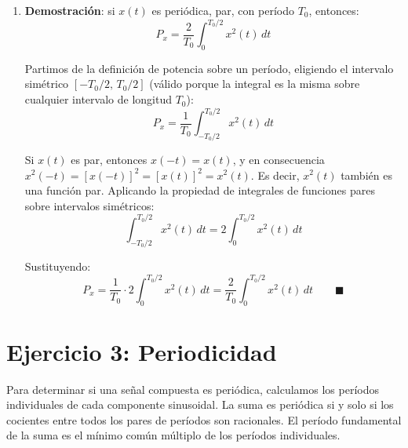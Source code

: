 \documentclass[10pt,a4paper]{article}
\begin{document}
\begin{enumerate}[label=\textbf{\alph*)}]
		\item \textbf{Demostración}: si $x(t)$ es periódica, par, con período $T_0$, entonces:
		\[
		P_x = \frac{2}{T_0}\int_{0}^{T_0/2} x^2(t)\,dt
		\]
		
		Partimos de la definición de potencia sobre un período, eligiendo el intervalo simétrico $[-T_0/2,\, T_0/2]$ (válido porque la integral es la misma sobre cualquier intervalo de longitud $T_0$):
		\[
		P_x = \frac{1}{T_0}\int_{-T_0/2}^{T_0/2} x^2(t)\,dt
		\]
		
		Si $x(t)$ es par, entonces $x(-t)=x(t)$, y en consecuencia $x^2(-t) = [x(-t)]^2 = [x(t)]^2 = x^2(t)$. Es decir, $x^2(t)$ también es una función par. Aplicando la propiedad de integrales de funciones pares sobre intervalos simétricos:
		\[
		\int_{-T_0/2}^{T_0/2} x^2(t)\,dt = 2\int_{0}^{T_0/2} x^2(t)\,dt
		\]
		
		Sustituyendo:
		\[
		P_x = \frac{1}{T_0}\cdot 2\int_{0}^{T_0/2} x^2(t)\,dt = \frac{2}{T_0}\int_{0}^{T_0/2} x^2(t)\,dt \qquad \blacksquare
		\]
	\end{enumerate}

	\section*{Ejercicio 3: Periodicidad}
	
	Para determinar si una señal compuesta es periódica, calculamos los períodos individuales de cada componente sinusoidal. La suma es periódica si y solo si los cocientes entre todos los pares de períodos son racionales. El período fundamental de la suma es el mínimo común múltiplo de los períodos individuales.
	
\end{document}
